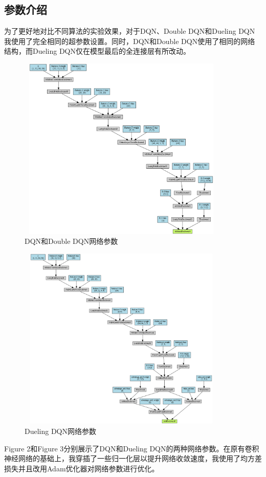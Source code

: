 \documentclass[a4paper,12pt]{article}
\begin{document}
\begin{CJK}{UTF8}{gbsn}
\subsection{参数介绍}
为了更好地对比不同算法的实验效果，对于DQN、Double DQN和Dueling DQN我使用了完全相同的超参数设置。同时，DQN和Double DQN使用了相同的网络结构，而Dueling DQN仅在模型最后的全连接层有所改动。
\newpage 
\begin{figure}[h!]
	\centering
	\includegraphics[width=10cm,height=8.8cm]{./resource/model.png}
	\caption{DQN和Double DQN网络参数}
\end{figure}
\begin{figure}[h!]
	\centering
	\includegraphics[width=10cm,height=8.8cm]{./resource/dueling_model.png}
	\caption{Dueling DQN网络参数}
\end{figure}
\newpage
\noindent Figure 2和Figure 3分别展示了DQN和Dueling DQN的两种网络参数。在原有卷积神经网络的基础上，我穿插了一些归一化层以提升网络收敛速度，我使用了均方差损失并且改用Adam优化器对网络参数进行优化。

\end{CJK}
\end{document}
